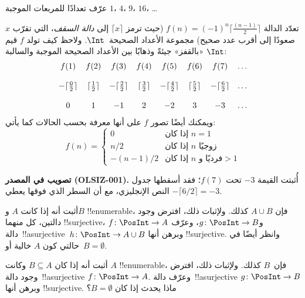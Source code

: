 \documentclass[../../../include/open-logic-section]{subfiles}
\begin{document}
\begin{prob}
عرّف تعدادًا للمربعات الموجبة $1$، $4$، $9$، $16$، \dots
\end{prob}

\begin{ex}
تعدّد الدالة $f(n) = (-1)^{n} \lceil \frac{(n-1)}{2}\rceil$ (حيث
ترمز $\lceil x \rceil$ إلى \emph{دالة السقف}، التي تقرّب $x$ صعودًا
إلى أقرب عدد صحيح) مجموعة الأعداد الصحيحة~$\Int$. ولاحظ كيف
تولد $f$ قيم $\Int$ «بالقفز» جيئةً وذهابًا بين الأعداد الصحيحة الموجبة
والسالبة:
\[
\begin{array}{c c c c c c c c}
f(1) & f(2) & f(3) & f(4) & f(5) & f(6) & f(7) & \dots \\ \\
- \lceil \tfrac{0}{2} \rceil & \lceil \tfrac{1}{2}\rceil & - \lceil \tfrac{2}{2} \rceil & \lceil \tfrac{3}{2} \rceil & - \lceil \tfrac{4}{2} \rceil  & \lceil \tfrac{5}{2}
\rceil & - \lceil \tfrac{6}{2} \rceil & \dots \\ \\
0 & 1 & -1 & 2 & -2 & 3 & -3 & \dots
\end{array}
\]
ويمكنك أيضًا تصور $f$ على أنها معرفة بحسب الحالات كما يأتي:
\[
f(n) = \begin{cases}
  0 & \text{إذا كان $n = 1$}\\
  n/2 & \text{إذا كان $n$ زوجيًا}\\
  -(n-1)/2 & \text{إذا كان $n$ فرديًا و$>1$}
  \end{cases}
\]
\end{ex}

\begin{editorial}
\textbf{تصويب في المصدر (OLSIZ-001).}
أُثبتت القيمة $-3$ تحت $f(7)$؛ فقد أسقطها جدول النص الإنجليزي، مع أن
السطر الذي فوقها يعطي $-\lceil 6/2\rceil=-3$.
\end{editorial}

\begin{prob}
  أثبت أنه إذا كانت $A$ و$B$ !!{enumerable}، فإن $A \cup B$
  كذلك. ولإثبات ذلك، افترض وجود دالتين، كل منهما !!{surjective}، $f\colon \PosInt \to
  A$ و$g\colon \PosInt \to B$، وعرّف
  دالة~!!a{surjective}~$h\colon \PosInt \to A \cup B$ وبرهن أنها
  !!{surjective}. وانظر أيضًا في حالتي كون $A$ خالية أو~$B = \emptyset$.
\end{prob}

\begin{prob}
  أثبت أنه إذا كان $B \subseteq A$ وكانت $A$ !!{enumerable}،
  فإن~$B$ كذلك. ولإثبات ذلك، افترض وجود دالة~!!a{surjective} $f\colon \PosInt \to
  A$. وعرّف دالة~!!a{surjective}
  $g\colon \PosInt \to B$ وبرهن أنها !!{surjective}. ماذا يحدث إذا
  كان $B = \emptyset$؟
\end{prob}
\end{document}

